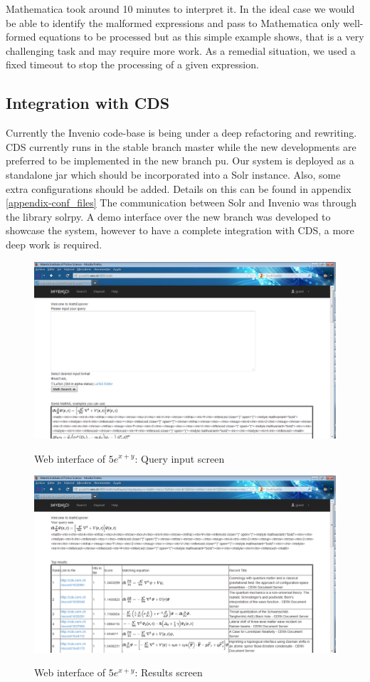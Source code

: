 Mathematica took around 10 minutes to interpret it.
In the ideal case we would be able to identify the malformed expressions and pass to Mathematica only well-formed equations to be processed but as this simple example shows, that is a very challenging task and may require more work.
As a remedial situation, we used a fixed timeout to stop the processing of a given expression.

\subsection{Integration with CDS}
Currently the Invenio code-base is being under a deep refactoring and rewriting. CDS currently runs in the stable branch {\codefont master} while the new developments are preferred to be implemented in the new branch {\codefont pu}. 
Our system is deployed as a standalone jar which should be incorporated into a Solr instance. Also, some extra configurations should be added. Details on this can be found in appendix \ref{appendix-conf_files}
The communication between Solr and Invenio was through the library {\codefont solrpy}. 
A demo interface over the new branch was developed to showcase the system, however to have a complete integration with CDS, a more deep work is required. 

\begin{figure}
\includegraphics[height=8 cm]{figures/input_interface.png}
\label{comparison_sw_table}
\caption{Web interface of $5e^{x+y}$: Query input screen}
\end{figure}

\begin{figure}
\includegraphics[height=8 cm]{figures/results_interface.png}
\label{comparison_sw_table}
\caption{Web interface of $5e^{x+y}$: Results screen}
\end{figure}

